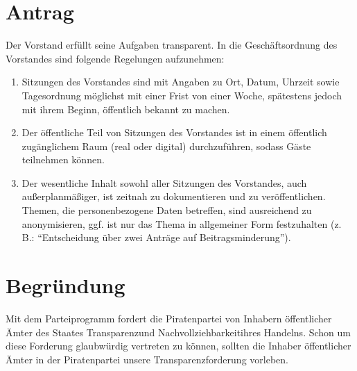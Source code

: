 \section{Antrag}

Der Vorstand erfüllt seine Aufgaben transparent. In die Geschäftsordnung des Vorstandes sind folgende Regelungen aufzunehmen:

\begin{enumerate}
\item
  Sitzungen des Vorstandes sind mit Angaben zu Ort, Datum, Uhrzeit sowie Tagesordnung möglichst mit einer Frist von einer Woche, spätestens jedoch mit ihrem Beginn, öffentlich bekannt zu machen.
\item
  Der öffentliche Teil von Sitzungen des Vorstandes ist in einem öffentlich zugänglichem Raum (real oder digital) durchzuführen, sodass Gäste teilnehmen können.
\item
  Der wesentliche Inhalt sowohl aller Sitzungen des Vorstandes, auch außerplanmäßiger, ist zeitnah zu dokumentieren und zu veröffentlichen. Themen, die personenbezogene Daten betreffen, sind ausreichend zu anonymisieren, ggf. ist nur das Thema in allgemeiner Form festzuhalten (z. B.: ``Entscheidung über zwei Anträge auf Beitragsminderung'').
\end{enumerate}
\section{Begründung}

Mit dem Parteiprogramm fordert die Piratenpartei von Inhabern öffentlicher Ämter des Staates Transparenzund Nachvollziehbarkeitihres Handelns. Schon um diese Forderung glaubwürdig vertreten zu können, sollten die Inhaber öffentlicher Ämter in der Piratenpartei unsere Transparenzforderung vorleben.

